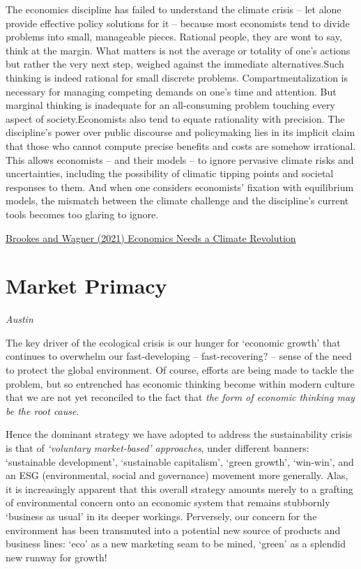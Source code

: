 \documentclass[
]{book}
\begin{document}
The economics discipline has failed to understand the climate crisis -- let alone provide effective policy solutions for it -- because most economists tend to divide problems into small, manageable pieces. Rational people, they are wont to say, think at the margin. What matters is not the average or totality of one's actions but rather the very next step, weighed against the immediate alternatives.Such thinking is indeed rational for small discrete problems. Compartmentalization is necessary for managing competing demands on one's time and attention. But marginal thinking is inadequate for an all-consuming problem touching every aspect of society.Economists also tend to equate rationality with precision. The discipline's power over public discourse and policymaking lies in its implicit claim that those who cannot compute precise benefits and costs are somehow irrational. This allows economists -- and their models -- to ignore pervasive climate risks and uncertainties, including the possibility of climatic tipping points and societal responses to them. And when one considers economists' fixation with equilibrium models, the mismatch between the climate challenge and the discipline's current tools becomes too glaring to ignore.

\href{https://www.project-syndicate.org/commentary/neoclassical-economics-fails-with-climate-change-by-tom-brookes-and-gernot-wagner-2021-06}{Brookes and Wagner (2021) Economics Needs a Climate Revolution}

\hypertarget{market-primacy}{%
\section{Market Primacy}\label{market-primacy}}

\emph{Austin}

The key driver of the ecological crisis is our hunger for `economic growth' that continues to overwhelm our fast-developing -- fast-recovering? -- sense of the need to protect the global environment. Of course, efforts are being made to tackle the problem, but so entrenched has economic thinking become within modern culture that we are not yet reconciled to the fact that \emph{the form of economic thinking may be the root cause}.

Hence the dominant strategy we have adopted to address the sustainability crisis is that of \emph{`voluntary market-based' approaches}, under different banners: `sustainable development', `sustainable capitalism', `green growth', `win-win', and an ESG (environmental, social and governance) movement more generally. Alas, it is increasingly apparent that this overall strategy amounts merely to a grafting of environmental concern onto an economic system that remains stubbornly `business as usual' in its deeper workings. Perversely, our concern for the environment has been transmuted into a potential new source of products and business lines: `eco' as a new marketing seam to be mined, `green' as a splendid new runway for growth!
\end{document}
